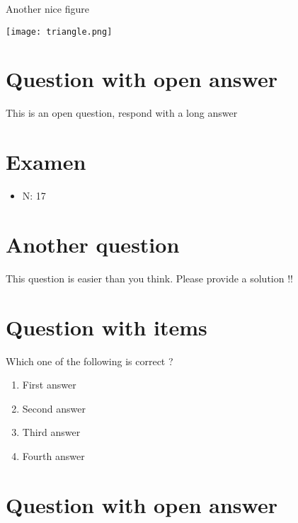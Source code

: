 \documentclass[a4paper,11pt,twoside]{article}
\begin{document}
Another nice figure

\begin{center}
\texttt{[image: triangle.png]}
\end{center}



\section*{Question with open answer}
\label{sec:org7e1b401}

This is an open question, respond with a long answer


\subsection*{}
\label{sec:org454e7ba}

\cleardoublepage

\section*{Examen}
\label{sec:orgb718628}
\begin{itemize}
\item N: 17
\end{itemize}
\section*{Another question}
\label{sec:org33d3495}

This question is easier than you think. Please provide a solution !!



\section*{Question with items}
\label{sec:org536b438}

Which one of the following is correct ?

\begin{enumerate}
\item First answer
\item Second answer
\item Third answer
\item Fourth answer
\end{enumerate}



\section*{Question with open answer}
\label{sec:orge699590}
\end{document}
